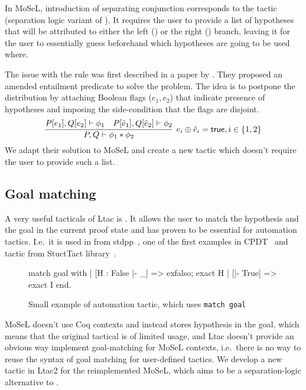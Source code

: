 In MoSeL, introduction of separating conjunction corresponds to the  tactic (separation logic variant of ).
It requires the user to provide a list of hypotheses that will be attributed to either the left () or the right () branch, leaving it for the user to essentially guess beforehand which hypotheses are going to be used where.

The issue with the rule was first described in a paper by \citet{harlandResourceDistributionBooleanConstraints2003}.
They proposed an amended entailment predicate to solve the problem.
The idea is to postpone the distribution by attaching Boolean flags (\(e_1, e_2\)) that indicate presence of hypotheses and imposing the side-condition that the flags are disjoint.
\[\infer[e_i \oplus \hat{e}_i = \true, i \in \{1,2\}]
        {P, Q \vdash \phi_1 \ast \phi_2}
        {P[e_1], Q[e_2] \vdash \phi_1 &
         P[\hat{e}_1], Q[\hat{e}_2] \vdash \phi_2} \]
We adapt their solution to MoSeL and create a new  tactic which doesn't require the user to provide such a list.

\subsection{Goal matching}
\label{sec:goal-matching}

A very useful tacticals of Ltac is .
It allows the user to match the hypothesis and the goal in the current proof state and has proven to be essential for automation tactics.
I.e.\ it is used in  from stdpp~\cite{std++developersandcontributorsStdpp}, one of the first examples in CPDT~\cite{chlipalaCertifiedProgrammingDependent2013} and  tactic from StuctTact library~\cite{uwplse-structtactdevelopmentteamStructTact2020}.

\begin{figure}[H]
\begin{coq}
match goal with
| [H : False |- _] => exfalso; exact H
| [|- True] => exact I
end.
\end{coq}
  \caption{Small example of automation tactic, which uses \texttt{match goal}}
  \label{fig:match-goal-example-intro}
\end{figure}

MoSeL doesn't use Coq contexts and instead stores hypothesis in the goal, which means that the original tactical is of limited usage, and Ltac doesn't provide an obvious way implement goal-matching for MoSeL contexts, i.e.\ there is no way to reuse the syntax of goal matching for user-defined tactics.
We develop a new tactic  in Ltac2 for the reimplemented MoSeL, which aims to be a separation-logic alternative to .

